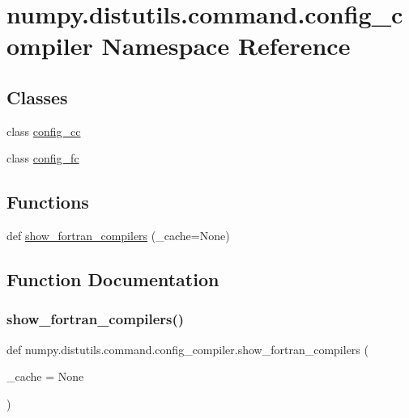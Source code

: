 \hypertarget{namespacenumpy_1_1distutils_1_1command_1_1config__compiler}{}\section{numpy.\+distutils.\+command.\+config\+\_\+compiler Namespace Reference}
\label{namespacenumpy_1_1distutils_1_1command_1_1config__compiler}
\subsection*{Classes}
\begin{DoxyCompactItemize}
\item 
class \hyperlink{classnumpy_1_1distutils_1_1command_1_1config__compiler_1_1config__cc}{config\+\_\+cc}
\item 
class \hyperlink{classnumpy_1_1distutils_1_1command_1_1config__compiler_1_1config__fc}{config\+\_\+fc}
\end{DoxyCompactItemize}
\subsection*{Functions}
\begin{DoxyCompactItemize}
\item 
def \hyperlink{namespacenumpy_1_1distutils_1_1command_1_1config__compiler_ae3d1c4edefe45ba49027fc63be136a9c}{show\+\_\+fortran\+\_\+compilers} (\+\_\+cache=None)
\end{DoxyCompactItemize}


\subsection{Function Documentation}
\mbox{\label{namespacenumpy_1_1distutils_1_1command_1_1config__compiler_ae3d1c4edefe45ba49027fc63be136a9c}} 
\subsubsection{\texorpdfstring{show\+\_\+fortran\+\_\+compilers()}{show\_fortran\_compilers()}}
{\footnotesize\ttfamily def numpy.\+distutils.\+command.\+config\+\_\+compiler.\+show\+\_\+fortran\+\_\+compilers (\begin{DoxyParamCaption}\item[{}]{\+\_\+cache = {\ttfamily None} }\end{DoxyParamCaption})}

